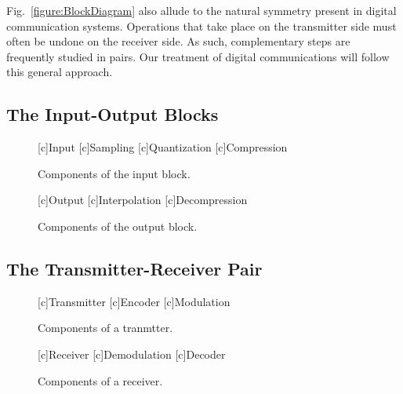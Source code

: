 Fig.~\ref{figure:BlockDiagram} also allude to the natural symmetry present in digital communication systems.
Operations that take place on the transmitter side must often be undone on the receiver side.
As such, complementary steps are frequently studied in pairs.
Our treatment of digital communications will follow this general approach.


\subsection{The Input-Output Blocks}

\begin{figure}[htbp]
\begin{center}
\begin{psfrags}
[c]{Input}
[c]{Sampling}
[c]{Quantization}
[c]{Compression}
\end{psfrags}
\end{center}
\caption{Components of the input block.}
\label{figure:BlockInput}
\end{figure}

\begin{figure}[htbp]
\begin{center}
\begin{psfrags}
[c]{Output}
[c]{Interpolation}
[c]{Decompression}
\end{psfrags}
\end{center}
\caption{Components of the output block.}
\label{figure:BlockOutput}
\end{figure}


\subsection{The Transmitter-Receiver Pair}

\begin{figure}[htbp]
\begin{center}
\begin{psfrags}
[c]{Transmitter}
[c]{Encoder}
[c]{Modulation}
\end{psfrags}
\end{center}
\caption{Components of a tranmtter.}
\label{figure:BlockTransmitter}
\end{figure}

\begin{figure}[htbp]
\begin{center}
\begin{psfrags}
[c]{Receiver}
[c]{Demodulation}
[c]{Decoder}
\end{psfrags}
\end{center}
\caption{Components of a receiver.}
\label{figure:BlockReceiver}
\end{figure}


